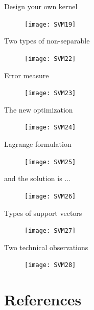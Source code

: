 \begin{frame}{Design your own kernel}
\begin{figure}
\texttt{[image: SVM19]}
\end{figure}
\end{frame}

\begin{frame}{Two types of non-separable}
\begin{figure}
\texttt{[image: SVM22]}
\end{figure}
\end{frame}

\begin{frame}{Error measure}
\begin{figure}
\texttt{[image: SVM23]}
\end{figure}
\end{frame}

\begin{frame}{The new optimization}
\begin{figure}
\texttt{[image: SVM24]}
\end{figure}
\end{frame}

\begin{frame}{Lagrange formulation}
\begin{figure}
\texttt{[image: SVM25]}
\end{figure}
\end{frame}

\begin{frame}{and the solution is ...}
\begin{figure}
\texttt{[image: SVM26]}
\end{figure}
\end{frame}

\begin{frame}{Types of support vectors}
\begin{figure}
\texttt{[image: SVM27]}
\end{figure}
\end{frame}

\begin{frame}{Two technical observations}
\begin{figure}
\texttt{[image: SVM28]}
\end{figure}
\end{frame}

\section{References}
